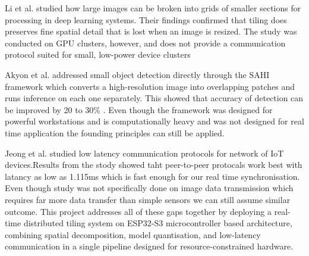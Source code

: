 Li et al. \cite{li2020pytorch}  studied how large images can be broken into grids of smaller sections for processing in deep learning systems. Their findings confirmed that tiling does preserves fine spatial detail that is lost when an image is resized. The study was conducted on GPU clusters, however, and does not provide a communication protocol suited for small, low-power device clusters

Akyon et al. \cite{akyon2022sahi} addressed small object detection directly through the SAHI framework which converts  a high-resolution image into overlapping patches and runs inference on each one separately. This showed that accuracy of detection can be improved by 20 to 30\% \cite{akyon2022sahi}. Even though the framework was designed for powerful workstations and is computationally heavy and was not designed for real time application the founding principles can still be applied.

Jeong et al. \cite{jeong2021} studied low latency communication protocols for network of IoT devices.Results from the stody showed taht peer-to-peer protocals work best with latancy as low as 1.115ms which is fast enough for our real time synchronisation. Even though study was not specifically done on image data transmission which requires far more data transfer than simple sensors we can still assume similar outcome.
This project addresses all of these gaps together by deploying a real-time distributed tiling system on ESP32-S3 microcontroller based architecture, combining spatial decomposition, model quantisation, and low-latency communication in a single pipeline designed for resource-constrained hardware.
